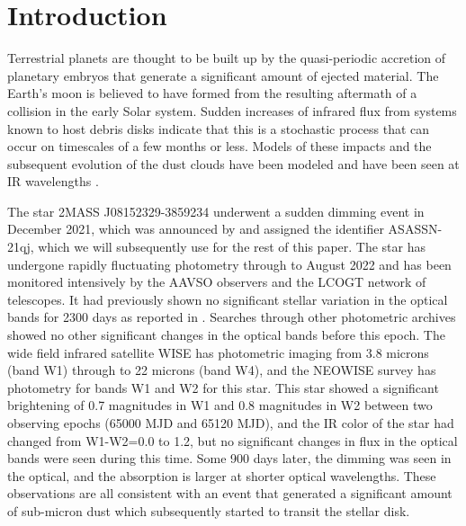 \documentclass{aa}
\newcommand{\asas}{ASASSN-21qj}
\begin{document}

   \maketitle
%

   \section{Introduction}

Terrestrial planets are thought to be built up by the quasi-periodic accretion of planetary embryos that generate a significant amount of ejected material.
%
The Earth's moon is believed to have formed from the resulting aftermath of a collision in the early Solar system.
%
Sudden increases of infrared flux from systems known to host debris disks indicate that this is a stochastic process that can occur on timescales of a few months or less.
%
Models of these impacts and the subsequent evolution of the dust clouds have been modeled \citep{Jackson12,Jackson14} and have been seen at IR wavelengths \citep{Su19,Su22}.

The star 2MASS J08152329-3859234 underwent a sudden dimming event in December 2021, which was announced by \citet{RizzoSmith21} and assigned the identifier \asas, which we will subsequently use for the rest of this paper.
%
The star has undergone rapidly fluctuating photometry through to August 2022 \citep{RizzoSmith22} and has been monitored intensively by the AAVSO observers and the LCOGT network of telescopes.
%
It had previously shown no significant stellar variation in the optical bands for 2300 days as reported in \citet{RizzoSmith21}.
%
Searches through other photometric archives showed no other significant changes in the optical bands before this epoch.
%
The wide field infrared satellite WISE has photometric imaging from 3.8 microns (band W1) through to 22 microns (band W4), and the NEOWISE survey has photometry for bands W1 and W2 for this star.
%
This star showed a significant brightening of 0.7 magnitudes in W1 and 0.8 magnitudes in W2 between two observing epochs (65000 MJD and 65120 MJD), and the IR color of the star had changed from W1-W2=0.0 to 1.2, but no significant changes in flux in the optical bands were seen during this time.
%
Some 900 days later, the dimming was seen in the optical, and the absorption is larger at shorter optical wavelengths.
%
These observations are all consistent with an event that generated a significant amount of sub-micron dust which subsequently started to transit the stellar disk.
\end{document}
